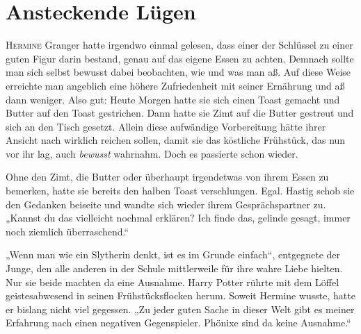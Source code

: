 \chapter{Ansteckende Lügen}

\lettrine{H}{ermine} Granger hatte irgendwo einmal gelesen, dass einer der Schlüssel zu einer guten Figur darin bestand, genau auf das eigene Essen zu achten. Demnach sollte man sich selbst bewusst dabei beobachten, wie und was man aß. Auf diese Weise erreichte man angeblich eine höhere Zufriedenheit mit seiner Ernährung und aß dann weniger.
Also gut: Heute Morgen hatte sie sich einen Toast gemacht und Butter auf den Toast gestrichen. Dann hatte sie Zimt auf die Butter gestreut und sich an den Tisch gesetzt. Allein diese aufwändige Vorbereitung hätte ihrer Ansicht nach wirklich reichen sollen, damit sie das köstliche Frühstück, das nun vor ihr lag, auch \emph{bewusst} wahrnahm. Doch es passierte schon wieder.

Ohne den Zimt, die Butter oder überhaupt irgendetwas von ihrem Essen zu bemerken, hatte sie bereits den halben Toast verschlungen. Egal. Hastig schob sie den Gedanken beiseite und wandte sich wieder ihrem Gesprächspartner zu.
„Kannst du das vielleicht nochmal erklären? Ich finde das, gelinde gesagt, immer noch ziemlich überraschend.“

„Wenn man wie ein Slytherin denkt, ist es im Grunde einfach“, entgegnete der Junge, den alle anderen in der Schule mittlerweile für ihre wahre Liebe hielten. Nur sie beide machten da eine Ausnahme. Harry Potter rührte mit dem Löffel geistesabwesend in seinen Frühstücksflocken herum. Soweit Hermine wusste, hatte er bislang nicht viel gegessen.
„Zu jeder guten Sache in dieser Welt gibt es meiner Erfahrung nach einen negativen Gegenspieler. Phönixe sind da keine Ausnahme.“

